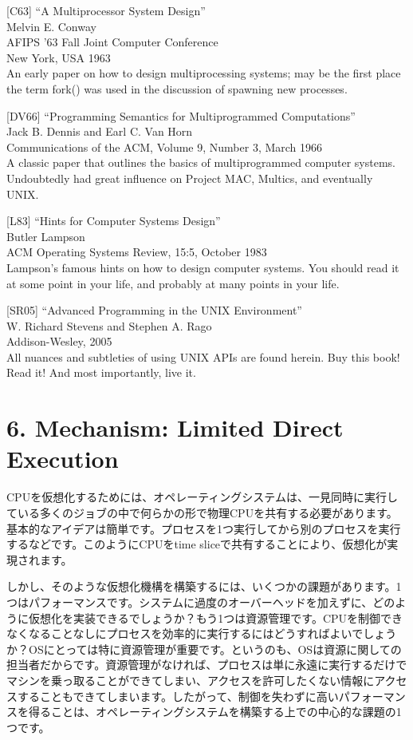 {[}C63{]} ``A Multiprocessor System Design''\\
Melvin E. Conway\\
AFIPS '63 Fall Joint Computer Conference\\
New York, USA 1963\\
An early paper on how to design multiprocessing systems; may be the
first place the term fork() was used in the discussion of spawning new
processes.

{[}DV66{]} ``Programming Semantics for Multiprogrammed Computations''\\
Jack B. Dennis and Earl C. Van Horn\\
Communications of the ACM, Volume 9, Number 3, March 1966\\
A classic paper that outlines the basics of multiprogrammed computer
systems. Undoubtedly had great influence on Project MAC, Multics, and
eventually UNIX.

{[}L83{]} ``Hints for Computer Systems Design''\\
Butler Lampson\\
ACM Operating Systems Review, 15:5, October 1983\\
Lampson's famous hints on how to design computer systems. You should
read it at some point in your life, and probably at many points in your
life.

{[}SR05{]} ``Advanced Programming in the UNIX Environment''\\
W. Richard Stevens and Stephen A. Rago\\
Addison-Wesley, 2005\\
All nuances and subtleties of using UNIX APIs are found herein. Buy this
book! Read it! And most importantly, live it.

\newpage

\hypertarget{mechanism-limited-direct-execution}{%
\section*{6. Mechanism: Limited Direct
Execution}\label{mechanism-limited-direct-execution}}

CPUを仮想化するためには、オペレーティングシステムは、一見同時に実行している多くのジョブの中で何らかの形で物理CPUを共有する必要があります。基本的なアイデアは簡単です。プロセスを1つ実行してから別のプロセスを実行するなどです。このようにCPUをtime
sliceで共有することにより、仮想化が実現されます。

しかし、そのような仮想化機構を構築するには、いくつかの課題があります。1つはパフォーマンスです。システムに過度のオーバーヘッドを加えずに、どのように仮想化を実装できるでしょうか？もう1つは資源管理です。CPUを制御できなくなることなしにプロセスを効率的に実行するにはどうすればよいでしょうか？OSにとっては特に資源管理が重要です。というのも、OSは資源に関しての担当者だからです。資源管理がなければ、プロセスは単に永遠に実行するだけでマシンを乗っ取ることができてしまい、アクセスを許可したくない情報にアクセスすることもできてしまいます。したがって、制御を失わずに高いパフォーマンスを得ることは、オペレーティングシステムを構築する上での中心的な課題の1つです。

